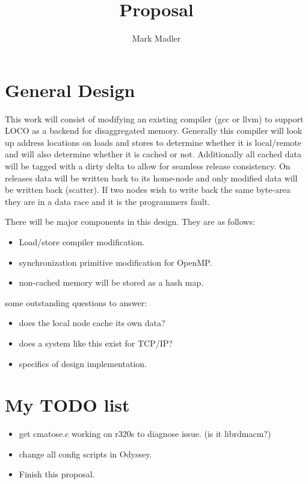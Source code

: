 \documentclass[sigplan,nonacm]{acmart}
\title{Proposal}
\author{Mark Madler}
\begin{document}
\maketitle

\section{General Design}
This work will consist of modifying an existing compiler (gcc or llvm) to 
support LOCO as a backend for disaggregated memory. Generally this compiler will 
look up address locations on loads and stores to determine whether it is local/remote 
and will also determine whether it is cached or not. Additionally all cached data will 
be tagged with a dirty delta to allow for seamless release consistency. On releases 
data will be written back to its home-node and only modified data will be written back 
(scatter). If two nodes wish to write back the same byte-area they are in a data race 
and it is the programmers fault. 

There will be {} major components in this design. They are as follows:

\begin{itemize}
    \item Load/store compiler modification.
    \item synchronization primitive modification for OpenMP.
    \item non-cached memory will be stored as a hash map.
\end{itemize}


some outstanding questions to answer:
\begin{itemize}
    \item does the local node cache its own data?
    \item does a system like this exist for TCP/IP?
    \item specifics of design implementation.
\end{itemize}

\section{My TODO list}
\begin{itemize}
    \item get cmatose.c working on r320s to diagnose issue. (is it librdmacm?)
    \item change all config scripts in Odyssey.
    \item Finish this proposal.
\end{itemize}


% 
% 
\end{document}
